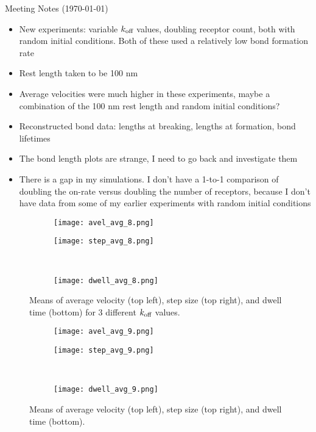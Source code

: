 \documentclass{article}
\newcommand{\tn}{\textnormal}
\begin{document}
\pagestyle{plain}

\begin{center}
  {\Large Meeting Notes (\today)}
\end{center}

\begin{itemize}
\item New experiments: variable $k_\tn{off}$ values, doubling receptor
  count, both with random initial conditions. Both of these used a
  relatively low bond formation rate
\item Rest length taken to be 100 nm
\item Average velocities were much higher in these experiments, maybe
  a combination of the 100 nm rest length and random initial conditions?
\item Reconstructed bond data: lengths at breaking, lengths at
  formation, bond lifetimes
\item The bond length plots are strange, I need to go back and
  investigate them
\item There is a gap in my simulations. I don't have a 1-to-1
  comparison of doubling the on-rate versus doubling the number of
  receptors, because I don't have data from some of my earlier
  experiments with random initial conditions
\end{itemize}

\begin{figure}[h]
  \centering
  \begin{subfigure}{0.49\textwidth}
    \texttt{[image: avel\_avg\_8.png]}
  \end{subfigure}
  \hfill
  \begin{subfigure}{0.49\textwidth}
    \texttt{[image: step\_avg\_8.png]}
  \end{subfigure}
  \\
  \begin{subfigure}{0.49\textwidth}
    \texttt{[image: dwell\_avg\_8.png]}
  \end{subfigure}
  \label{fig:stats}
  \caption{Means of average velocity (top left), step size (top
    right), and dwell time (bottom) for 3 different $k_\tn{off}$
    values.}
\end{figure}

\begin{figure}[h]
  \centering
  \begin{subfigure}{0.49\textwidth}
    \texttt{[image: avel\_avg\_9.png]}
  \end{subfigure}
  \hfill
  \begin{subfigure}{0.49\textwidth}
    \texttt{[image: step\_avg\_9.png]}
  \end{subfigure}
  \\
  \begin{subfigure}{0.49\textwidth}
    \texttt{[image: dwell\_avg\_9.png]}
  \end{subfigure}
  \label{fig:stats}
  \caption{Means of average velocity (top left), step size (top
    right), and dwell time (bottom).}
\end{figure}
\end{document}

